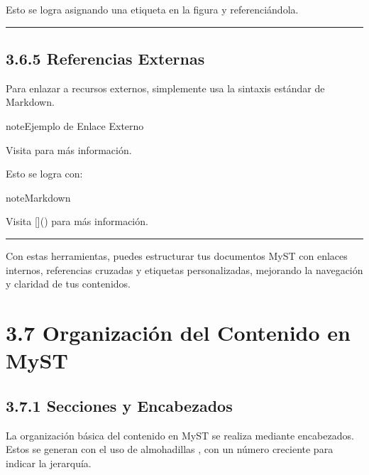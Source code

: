 \documentclass[a4paper,10pt,spanish]{sphinxmanual}
\begin{document}
\sphinxAtStartPar
Esto se logra asignando una etiqueta en la figura y referenciándola.


\bigskip\hrule\bigskip



\subsection{3.6.5 Referencias Externas}
\label{\detokenize{3_guia_myst/cross_references:referencias-externas}}
\sphinxAtStartPar
Para enlazar a recursos externos, simplemente usa la sintaxis estándar de Markdown.

\begin{sphinxadmonition}{note}{Ejemplo de Enlace Externo}

\sphinxAtStartPar
Visita  para más información.
\end{sphinxadmonition}

\sphinxAtStartPar
Esto se logra con:

\begin{sphinxadmonition}{note}{Markdown}

\begin{sphinxVerbatim}[commandchars=\\\{\}]
Visita []() para más información.
\end{sphinxVerbatim}
\end{sphinxadmonition}


\bigskip\hrule\bigskip


\sphinxAtStartPar
Con estas herramientas, puedes estructurar tus documentos MyST con enlaces internos, referencias cruzadas y etiquetas personalizadas, mejorando la navegación y claridad de tus contenidos.

\sphinxstepscope


\section{3.7 Organización del Contenido en MyST}
\label{\detokenize{3_guia_myst/organizacion_contenido:organizacion-del-contenido-en-myst}}\label{\detokenize{3_guia_myst/organizacion_contenido::doc}}

\subsection{3.7.1 Secciones y Encabezados}
\label{\detokenize{3_guia_myst/organizacion_contenido:secciones-y-encabezados}}
\sphinxAtStartPar
La organización básica del contenido en MyST se realiza mediante encabezados. Estos se generan con el uso de almohadillas \sphinxcode{\sphinxupquote{\#}}, con un número creciente para indicar la jerarquía.
\end{document}
